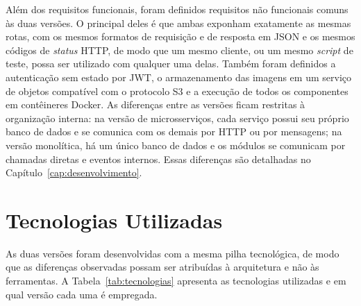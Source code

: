 Além dos requisitos funcionais, foram definidos requisitos não funcionais comuns às duas
versões. O principal deles é que ambas exponham exatamente as mesmas rotas, com os mesmos
formatos de requisição e de resposta em JSON e os mesmos códigos de \textit{status} HTTP, de
modo que um mesmo cliente, ou um mesmo \textit{script} de teste, possa ser utilizado com
qualquer uma delas. Também foram definidos a autenticação sem estado por JWT, o armazenamento
das imagens em um serviço de objetos compatível com o protocolo S3 e a execução de todos os
componentes em contêineres Docker. As diferenças entre as versões ficam restritas à
organização interna: na versão de microsserviços, cada serviço possui seu próprio banco de
dados e se comunica com os demais por HTTP ou por mensagens; na versão monolítica, há um único
banco de dados e os módulos se comunicam por chamadas diretas e eventos internos. Essas
diferenças são detalhadas no Capítulo~\ref{cap:desenvolvimento}.

\section{Tecnologias Utilizadas}

As duas versões foram desenvolvidas com a mesma pilha tecnológica, de modo que as diferenças
observadas possam ser atribuídas à arquitetura e não às ferramentas. A
Tabela~\ref{tab:tecnologias} apresenta as tecnologias utilizadas e em qual versão cada uma é
empregada.

